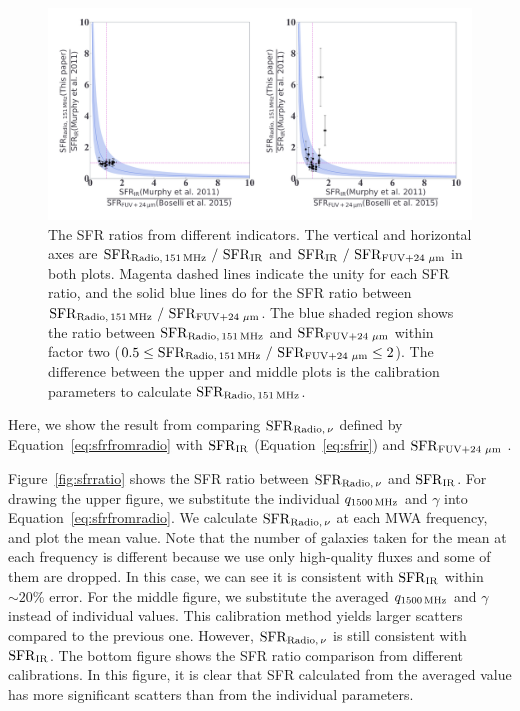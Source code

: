\begin{figure}[htbp]
	\centering
	\includegraphics[width=\linewidth]{Chapter_5/Figures/Result_sfrratios.pdf}
    \caption[The consistency of the radio SFR with $\mr{SFR}\msb{IR}$ and $\mr{SFR}\msb{FUV+24\,\micron}$]{\label{fig:sfrratios}
        The SFR ratios from different indicators.
        The vertical and horizontal axes are $\mr{SFR}\msb{Radio,\,151\MHz}\ /\ \mr{SFR}\msb{IR}$ and $\mr{SFR}\msb{IR}\ /\ \mr{SFR}\msb{FUV+24\,\micron}$ in both plots.
        Magenta dashed lines indicate the unity for each SFR ratio, and the solid blue lines do for the SFR ratio between $\mr{SFR}\msb{Radio,\,151\MHz}\ /\ \mr{SFR}\msb{FUV+24\,\micron}$.
        The blue shaded region shows the ratio between $\mathrm{SFR}_{\mathrm{Radio},\,151\,\mathrm{MHz}}$ and $\mr{SFR}\msb{FUV+24\,\micron}$ within factor two ($0.5 \leq \mathrm{SFR}_{\mathrm{Radio},\,151\,\mathrm{MHz}}\ /\ \mathrm{SFR}_{\mathrm{FUV+24\,\,\mathrm{\mu m}}} \leq 2$).
        The difference between the upper and middle plots is the calibration parameters to calculate $\mathrm{SFR}_{\mathrm{Radio},\,151\,\mathrm{MHz}}$.
    }
\end{figure}

Here, we show the result from comparing $\mathrm{SFR}_{\mathrm{Radio},\,\nu}$ defined by Equation~\ref{eq:sfrfromradio} with $\mr{SFR}\msb{IR}$ (Equation~\ref{eq:sfrir}) and $\mr{SFR}\msb{FUV+24\,\micron}$ \citep{Boselli2015}.

Figure~\ref{fig:sfrratio} shows the SFR ratio between $\mathrm{SFR}_{\mathrm{Radio},\,\nu}$ and $\mr{SFR}\msb{IR}$.
For drawing the upper figure, we substitute the individual $q_{1500\,\mathrm{MHz}}$ and $\gamma$ into Equation~\ref{eq:sfrfromradio}.
We calculate $\mathrm{SFR}_{\mathrm{Radio},\,\nu}$ at each MWA frequency, and plot the mean value.
Note that the number of galaxies taken for the mean at each frequency is different because we use only high-quality fluxes and some of them are dropped.
In this case, we can see it is consistent with $\mr{SFR}\msb{IR}$ within $\sim 20\%$ error.
For the middle figure, we substitute the averaged $q_{1500\,\mathrm{MHz}}$ and $\gamma$ instead of individual values.
This calibration method yields larger scatters compared to the previous one.
However, $\mathrm{SFR}_{\mathrm{Radio},\,\nu}$ is still consistent with $\mr{SFR}\msb{IR}$.
The bottom figure shows the SFR ratio comparison from different calibrations.
In this figure, it is clear that SFR calculated from the averaged value has more significant scatters than from the individual parameters.

